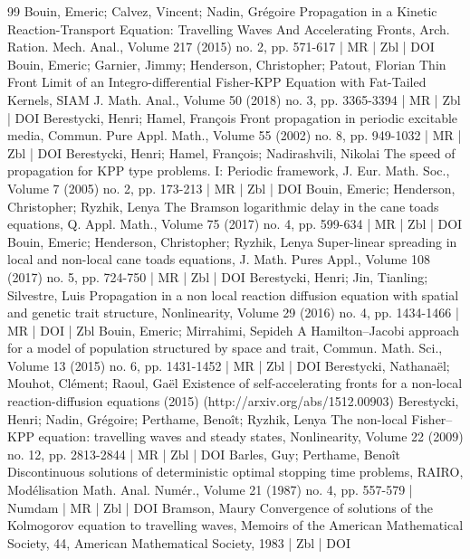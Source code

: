 \documentclass[10pt]{amsart}
\theoremstyle{definition}\newtheorem{defi}[theo]{Definition}\newtheorem{rema}[theo]{Remark}\newtheorem{exam}[theo]{Example}\newtheorem{exem}[theo]{Example}\newtheorem{nota}[theo]{Notation}
\newcommand{\1}{\mathds{1}}
\begin{document}
\begin{thebibliography}{99}
Bouin, Emeric; Calvez, Vincent; Nadin, Grégoire Propagation in a Kinetic Reaction-Transport Equation: Travelling Waves And Accelerating Fronts, Arch. Ration. Mech. Anal., Volume 217 (2015) no. 2, pp. 571-617 | MR | Zbl | DOI
Bouin, Emeric; Garnier, Jimmy; Henderson, Christopher; Patout, Florian Thin Front Limit of an Integro-differential Fisher-KPP Equation with Fat-Tailed Kernels, SIAM J. Math. Anal., Volume 50 (2018) no. 3, pp. 3365-3394 | MR | Zbl | DOI
Berestycki, Henri; Hamel, François Front propagation in periodic excitable media, Commun. Pure Appl. Math., Volume 55 (2002) no. 8, pp. 949-1032 | MR | Zbl | DOI
Berestycki, Henri; Hamel, François; Nadirashvili, Nikolai The speed of propagation for KPP type problems. I: Periodic framework, J. Eur. Math. Soc., Volume 7 (2005) no. 2, pp. 173-213 | MR | Zbl | DOI
Bouin, Emeric; Henderson, Christopher; Ryzhik, Lenya The Bramson logarithmic delay in the cane toads equations, Q. Appl. Math., Volume 75 (2017) no. 4, pp. 599-634 | MR | Zbl | DOI
Bouin, Emeric; Henderson, Christopher; Ryzhik, Lenya Super-linear spreading in local and non-local cane toads equations, J. Math. Pures Appl., Volume 108 (2017) no. 5, pp. 724-750 | MR | Zbl | DOI
Berestycki, Henri; Jin, Tianling; Silvestre, Luis Propagation in a non local reaction diffusion equation with spatial and genetic trait structure, Nonlinearity, Volume 29 (2016) no. 4, pp. 1434-1466 | MR | DOI | Zbl
Bouin, Emeric; Mirrahimi, Sepideh A Hamilton–Jacobi approach for a model of population structured by space and trait, Commun. Math. Sci., Volume 13 (2015) no. 6, pp. 1431-1452 | MR | Zbl | DOI
Berestycki, Nathanaël; Mouhot, Clément; Raoul, Gaël Existence of self-accelerating fronts for a non-local reaction-diffusion equations (2015) (http://arxiv.org/abs/1512.00903)
Berestycki, Henri; Nadin, Grégoire; Perthame, Benoît; Ryzhik, Lenya The non-local Fisher–KPP equation: travelling waves and steady states, Nonlinearity, Volume 22 (2009) no. 12, pp. 2813-2844 | MR | Zbl | DOI
Barles, Guy; Perthame, Benoît Discontinuous solutions of deterministic optimal stopping time problems, RAIRO, Modélisation Math. Anal. Numér., Volume 21 (1987) no. 4, pp. 557-579 | Numdam | MR | Zbl | DOI
Bramson, Maury Convergence of solutions of the Kolmogorov equation to travelling waves, Memoirs of the American Mathematical Society, 44, American Mathematical Society, 1983 | Zbl | DOI

\end{thebibliography}
\end{document}
